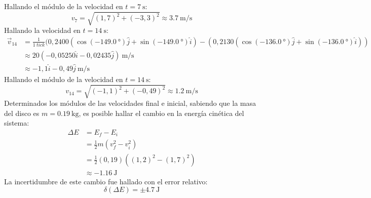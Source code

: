 \documentclass[../main.tex]{subfiles}
\begin{document}
Hallando el módulo de la velocidad en $t = \qty{7}{\second}$:
\begin{equation*}
  v_7 = \sqrt{(1,7)^2 + (-3,3)^2} \approx \qty{3,7}{\metre\per\second}
\end{equation*}
Hallando la velocidad en $t = \qty{14}{\second}$:
\begin{align*}
  \vec{v}_14 &= \frac{1}{\qty{1}{tick}}
  (0,2400(\cos{(\qty{-149,0}{\degree})}\hat{j} + \sin{(\qty{-149,0}{\degree})}\hat{i}) -
  (0,2130(\cos{(\qty{-136,0}{\degree})}\hat{j} + \sin{(\qty{-136,0}{\degree})}\hat{i})) \\
  &\approx 20(-0,05250 \hat{i} - 0,02435 \hat{j})\ \unit{\metre\per\second} \\
  &\approx -1,1 \hat{i} - 0,49 \hat{j}\ \unit{\metre\per\second}
\end{align*}
Hallando el módulo de la velocidad en $t = \qty{14}{\second}$:
\begin{equation*}
  v_14 = \sqrt{(-1,1)^2 + (-0,49)^2} \approx \qty{1,2}{\metre\per\second}
\end{equation*}
Determinados los módulos de las velocidades final e inicial, sabiendo que la masa del disco es $m = \qty{0,19}{\kilo\gram}$, es posible hallar el cambio en la energía cinética del sistema:
\begin{align*}
  \Delta E &= E_f - E_i \\
  &= \frac{1}{2}m(v_f^2 - v_i^2) \\
  &= \frac{1}{2}(0,19)((1,2)^2 - (1,7)^2) \\
  &\approx \qty{-1,16}{\joule}
\end{align*}
La incertidumbre de este cambio fue hallado con el error relativo:
\begin{equation*}
  \delta (\Delta E) = \pm \qty{4,7}{\joule}
\end{equation*}
\end{document}
